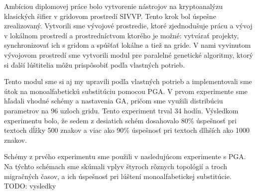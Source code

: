 
Ambíciou diplomovej práce bolo vytvorenie nástrojov na kryptoanalýzu klasických šifier v gridovom prostredí SIVVP.
Tento krok bol úspešne zrealizovaný. Vytvorili sme vývojové prostredie, ktoré zjednodušuje prácu a vývoj v lokálnom prostredí
a prostredníctvom ktorého je možné: vytvárať projekty,  synchronizovať ich s gridom a spúšťať lokálne a tiež na gride.
V nami vyvinutom vývojovom prostredí sme vytvorili modul pre paralelné genetické algoritmy,
ktorý si ďalší lúštitelia môžu prispôsobiť podľa vlastných potrieb.

Tento modul sme si aj my upravili podľa vlastných potrieb a implementovali sme útok na monoalfabetickú substitúciu pomocou PGA.
V prvom experimente sme hľadali vhodné schémy a nastavenia GA, pričom sme využili distribúciu parametrov na 96 uzloch gridu.
Tento experiment trval 34 hodín. Výsledkom experimentu bolo, že sedem z desiatich schém dosahovalo 80\% úspešnosť pri textoch
dĺžky 500 znakov a viac ako 90\% úspešnosť pri textoch dlhších ako 1000 znakov.

Schémy z prvého experimentu sme použili v nasledujúcom experimente s PGA.
Na týchto schémach sme skúmali vplyv štyroch rôznych topológií a troch migračných časov, a ich úspešnosť pri lúštení
monoalfabetickej substitúcie.
TODO: vysledky

